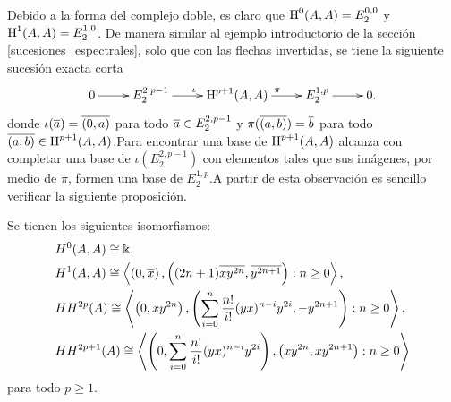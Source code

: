 \documentclass[fleqn,../tesis.tex]{subfiles}
\begin{document}
Debido a la forma del complejo doble, es claro que $\operatorname{H}^{0}(A, A) = E^{0, 0}_{2}$ y $\operatorname{H}^{1}(A, A) = E^{1, 0}_{2}$. De manera
similar al ejemplo introductorio de la sección \ref{sucesiones_espectrales}, solo que con las flechas invertidas, se tiene la siguiente
sucesión exacta corta
\begin{align*}
\xymatrix{
    0 \ar[r] & E^{2, p - 1}_{2} \ar[r]^{\iota} & \Hy^{p + 1}(A, A) \ar[r]^{\pi} & E^{1, p}_2 \ar[r] & 0.
}
\end{align*}
donde $\iota(\overline{a}) = \overline{(0, a)}$ para todo $\overline{a} \in E^{2, p - 1}_{2}$ y $\pi(\overline{(a, b)}) = \overline{b}$ para todo
$\overline{(a, b)} \in \operatorname{H}^{p + 1}(A, A)$.Para encontrar una
base de $\operatorname{H}^{p + 1}(A, A)$ alcanza con completar una base de $\iota\left(E^{2, p - 1}_{2}\right)$ con elementos
tales que sus imágenes, por medio de $\pi$, formen una base de $E^{1, p}_{2}$.A partir
de esta observación es sencillo verificar la siguiente proposición.
\begin{prop}
    Se tienen los siguientes isomorfismos:
    \begin{align*}
        &H^0(A,A) \cong \Bbbk, \\
  		&H^1(A,A) \cong \left\langle \left(0, \overline{x}\right), \left((2n + 1)\overline{xy^{2n}}, \overline{y^{2n + 1}}\right): n \geq 0\right\rangle, \\
  		&HH^{2p}(A) \cong \left\langle \left(0, xy^{2n}\right),
  			\left(\sum_{i = 0}^n\frac{n!}{i!}(yx)^{n - i}y^{2i}, -y^{2n + 1} \right): n \geq 0\right\rangle,\\
  		&HH^{2p + 1}(A) \cong \left\langle \left(0, \sum_{i = 0}^n\frac{n!}{i!}(yx)^{n - i}y^{2i}\right),
  			\left(xy^{2n}, xy^{2n + 1}\right) : n \geq 0\right\rangle 
    \end{align*}
    para todo $p\geq 1$.
\end{prop}
\end{document}
